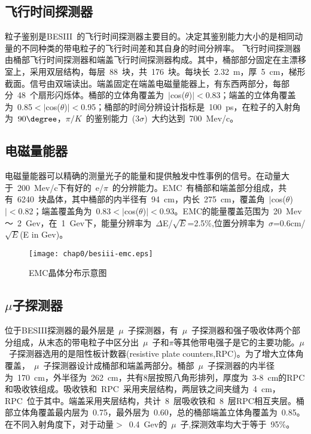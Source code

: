 \subsection{飞行时间探测器}
粒子鉴别是BESIII~的飞行时间探测器主要目的。决定其鉴别能力大小的是相同动量的不同种类的带电粒子的飞行时间差和其自身的时间分辨率。
飞行时间探测器由桶部飞行时间探测器和端盖飞行时间探测器构成。其中，桶部部分固定在主漂移室上，采用双层结构，每层~88~块，共~176~块。每块长~2.32~m，厚~5~cm，梯形截面。信号由双端读出。端盖固定在端盖电磁量能器上，有东西两部分，每部分~48~个扇形闪烁体。桶部的立体角覆盖为~$|$cos($\theta$)$|<$0.83；端盖的立体角覆盖为~0.85$<|$cos($\theta$)$|<$0.95；桶部的时间分辨设计指标是~100~ps，在粒子的入射角为~$90\degree$，$\pi/K$~的鉴别能力~(3$\sigma$)~大约达到~700~Mev/c。

\subsection{电磁量能器}

电磁量能器可以精确的测量光子的能量和提供触发中性事例的信号。在动量大于~200~Mev/c下有好的~e/$\pi$~的分辨能力。EMC~有桶部和端盖部分组成，共有~6240~块晶体，其中桶部的内半径有~94~cm，内长~275~cm，覆盖角~$|$cos($\theta$)$|<$0.82；端盖覆盖角为~0.83$<|$cos($\theta$)$|<$0.93。EMC的能量覆盖范围为~20~Mev～~2~Gev，在~1~Gev下，能量分辨率为~$\Delta$E/$\sqrt E$=2.5$\%$,位置分辨率为~$\sigma$=0.6cm/$\sqrt E$(E in Gev)。
\begin{figure}[!h]
  \centering
  \texttt{[image: chap0/besiii-emc.eps]}
  \caption{EMC晶体分布示意图}
  \label{fig:besiii-emc}
\end{figure}

\subsection{$\mu$子探测器}

位于BESIII探测器的最外层是~$\mu$~子探测器，有~$\mu$~子探测器和强子吸收体两个部分组成，从末态的带电粒子中区分出~$\mu$~子和$\pi$等其他带电强子是它的主要功能。$\mu$~子探测器选用的是阻性板计数器(resistive plate counters,RPC)。为了增大立体角覆盖，~$\mu$~子探测器设计成桶部和端盖两部分。桶部~$\mu$~子探测器的内半径为~170~cm，外半径为~262~cm，共有8层按照八角形排列，厚度为~3-8~cm的RPC和吸收铁组成。吸收铁和~RPC~采用夹层结构，两层铁之间夹缝为~4~cm，RPC~位于其中。端盖采用夹层结构，共计~8~层吸收铁和~8~层RPC相互夹层。桶部立体角覆盖最内层为~0.75，最外层为~0.60，总的桶部端盖立体角覆盖为~0.85。在不同入射角度下，对于动量$>$~0.4~Gev的~$\mu$~子,探测效率均大于等于~95$\%$。

